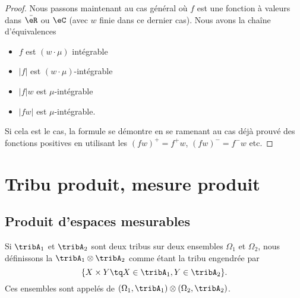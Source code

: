 \begin{proof}
    Nous passons maintenant au cas général où \( f\) est une fonction à valeurs dans \( \bar\eR\) ou \( \eC\) (avec \( w\) finie dans ce dernier cas). Nous avons la chaîne d'équivalences 
    \begin{itemize}
            \renewcommand{\labelitemi}{$\Leftrightarrow$}
        \item \( f\) est \( (w\cdot\mu)\) intégrable
        \item \( | f |\) est \( (w\cdot\mu)\)-intégrable
        \item \( | f |w\) est \( \mu\)-intégrable
        \item \( | fw |\) est \( \mu\)-intégrable.
    \end{itemize}

    Si cela est le cas, la formule se démontre en se ramenant au cas déjà prouvé des fonctions positives en utilisant les \( (fw)^+=f^+w\), \( (fw)^-=f^-w\) etc.
\end{proof}

\section{Tribu produit, mesure produit}

\subsection{Produit d'espaces mesurables}

\begin{definition}      \label{DefTribProfGfYTuR}
    Si \( \tribA_1\) et \( \tribA_2\) sont deux tribus sur deux ensembles \( \Omega_1\) et \( \Omega_2\), nous définissons la  \( \tribA_1\otimes\tribA_2\) comme étant la tribu engendrée par 
    \begin{equation}
        \{ X\times Y\tq X\in\tribA_1,Y\in\tribA_2 \}.
    \end{equation}
    Ces ensembles sont appelés  de \( (\Omega_1,\tribA_1)\otimes (\Omega_2,\tribA_2)\).
\end{definition}

